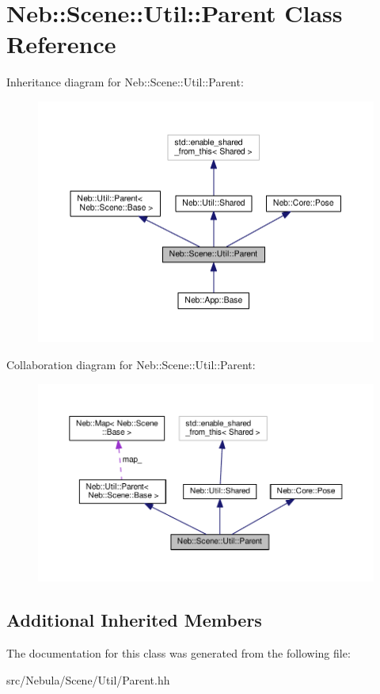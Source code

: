 \hypertarget{classNeb_1_1Scene_1_1Util_1_1Parent}{\section{Neb\-:\-:Scene\-:\-:Util\-:\-:Parent Class Reference}
\label{classNeb_1_1Scene_1_1Util_1_1Parent}
}


Inheritance diagram for Neb\-:\-:Scene\-:\-:Util\-:\-:Parent\-:
\nopagebreak
\begin{figure}[H]
\begin{center}
\leavevmode
\includegraphics[width=350pt]{classNeb_1_1Scene_1_1Util_1_1Parent__inherit__graph}
\end{center}
\end{figure}


Collaboration diagram for Neb\-:\-:Scene\-:\-:Util\-:\-:Parent\-:
\nopagebreak
\begin{figure}[H]
\begin{center}
\leavevmode
\includegraphics[width=350pt]{classNeb_1_1Scene_1_1Util_1_1Parent__coll__graph}
\end{center}
\end{figure}
\subsection*{Additional Inherited Members}


The documentation for this class was generated from the following file\-:\begin{DoxyCompactItemize}
\item 
src/\-Nebula/\-Scene/\-Util/Parent.\-hh\end{DoxyCompactItemize}
